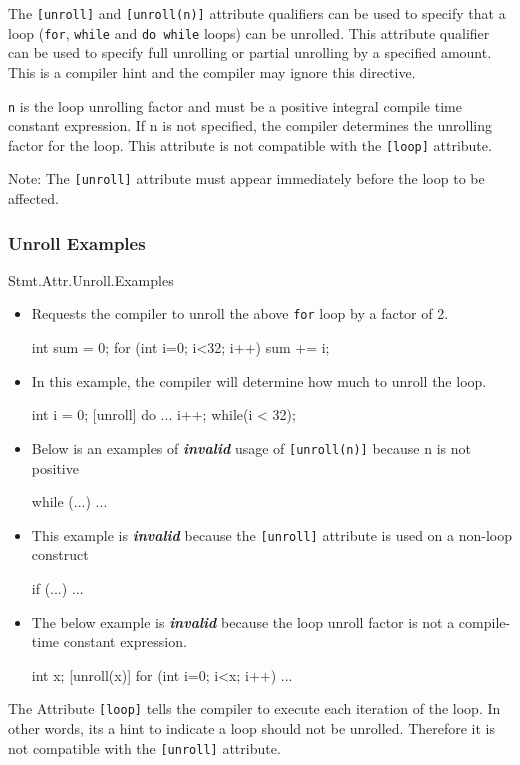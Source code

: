 The \texttt{[unroll]} and \texttt{[unroll(n)]} attribute qualifiers can be used
 to specify that a loop (\texttt{for}, \texttt{while} and \texttt{do while} 
loops) can be unrolled. This attribute qualifier can be used to specify full 
unrolling or partial unrolling by a specified amount. This is a compiler hint 
and the compiler may ignore this directive.

\texttt{n} is the loop unrolling factor and must be a positive integral compile time 
constant expression. If n is not specified, the compiler determines the 
unrolling factor for the loop. This attribute is not compatible with the \texttt{[loop]}
 attribute.

Note:  The \texttt{[unroll]} attribute  must appear immediately before the loop
 to be affected.

\subsubsection{Unroll Examples}{Stmt.Attr.Unroll.Examples}
\begin{itemize}
\item  Requests the compiler to unroll the above \texttt{for} loop by a factor 
of 2.
\begin{HLSL}
[unroll(2)]
int sum = 0;
for (int i=0; i<32; i++)
    sum += i;
\end{HLSL}
\item In this example, the compiler will determine how much to unroll the loop.
\begin{HLSL}
int i = 0;
[unroll]
do {
    ...
    i++;
} while(i < 32);
\end{HLSL}
\item Below is an  examples of \textbf{\emph{invalid}} usage of 
\texttt{[unroll(n)]} because n is not positive
\begin{HLSL}
[unroll(-1)]
while (...)
{
    ...
}
\end{HLSL}
\item This example is \textbf{\emph{invalid}} because the \texttt{[unroll]} 
attribute is used on a non-loop construct
\begin{HLSL}
[unroll]
if (...)
{
    ...
}
\end{HLSL}
\item The below example is \textbf{\emph{invalid}} because the loop unroll 
factor is not a compile-time constant expression.
\begin{HLSL}
    int x;
    [unroll(x)]
    for (int i=0; i<x; i++)
    {
        ...
    }
\end{HLSL}
\end{itemize}
The Attribute \texttt{[loop]} tells the compiler to execute each iteration of 
the loop. In other words, its a hint to indicate a loop should not be 
unrolled. Therefore it is not compatible with the \texttt{[unroll]} attribute.

